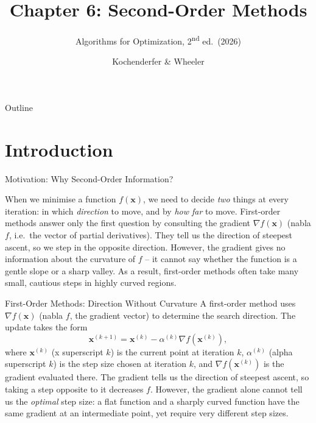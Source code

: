\documentclass[aspectratio=169,10pt]{beamer}
\title[Ch.\,6 Second-Order Methods]{Chapter 6: Second-Order Methods}
\subtitle{Algorithms for Optimization, 2\textsuperscript{nd} ed.\ (2026)}
\author{Kochenderfer \& Wheeler}
\institute{Lecture Slides}
\date{}
\newcommand{\xbf}{\mathbf{x}}
\begin{document}
\begin{frame}
  \titlepage
\end{frame}

\begin{frame}{Outline}
  \tableofcontents
\end{frame}

\section{Introduction}

\begin{frame}[allowframebreaks]{Motivation: Why Second-Order Information?}

  When we minimise a function $f(\xbf)$, we need to decide \emph{two} things at
  every iteration: in which \emph{direction} to move, and by \emph{how far} to
  move.  First-order methods answer only the first question by consulting the
  gradient $\nabla f(\xbf)$ (nabla $f$, i.e.\ the vector of partial derivatives).
  They tell us the direction of steepest ascent, so we step in the opposite
  direction.  However, the gradient gives no information about the curvature of
  $f$ -- it cannot say whether the function is a gentle slope or a sharp valley.
  As a result, first-order methods often take many small, cautious steps in highly
  curved regions.

  \begin{block}{First-Order Methods: Direction Without Curvature}
    A first-order method uses $\nabla f(\xbf)$ (nabla $f$, the gradient vector) to
    determine the search direction.  The update takes the form
    \[
      \xbf^{(k+1)} = \xbf^{(k)} - \alpha^{(k)} \nabla f\!\left(\xbf^{(k)}\right),
    \]
    where $\xbf^{(k)}$ (x superscript $k$) is the current point at iteration $k$,
    $\alpha^{(k)}$ (alpha superscript $k$) is the step size chosen at iteration $k$,
    and $\nabla f(\xbf^{(k)})$ is the gradient evaluated there.  The gradient tells
    us the direction of steepest ascent, so taking a step opposite to it decreases
    $f$.  However, the gradient alone cannot tell us the \emph{optimal} step size:
    a flat function and a sharply curved function have the same gradient at an
    intermediate point, yet require very different step sizes.
  \end{block}


\end{frame}
\end{document}
